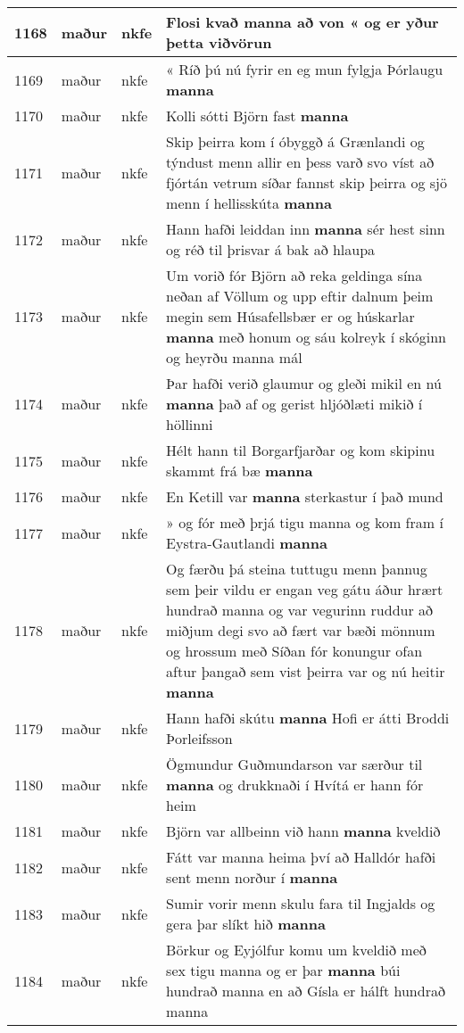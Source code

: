 \documentclass{article}
\begin{document}
\begin{longtable}{p{1cm}|p{1cm}|p{1cm}|p{13cm}}
\hline
1168&maður&nkfe&Flosi kvað \textbf{manna} að von « og er yður þetta viðvörun\\
\hline
1169&maður&nkfe&« Ríð þú nú fyrir en eg mun fylgja Þórlaugu \textbf{manna} \\
\hline
1170&maður&nkfe&Kolli sótti Björn fast \textbf{manna} \\
\hline
1171&maður&nkfe&Skip þeirra kom í óbyggð á Grænlandi og týndust menn allir en þess varð svo víst að fjórtán vetrum síðar fannst skip þeirra og sjö menn í hellisskúta \textbf{manna} \\
\hline
1172&maður&nkfe&Hann hafði leiddan inn \textbf{manna} sér hest sinn og réð til þrisvar á bak að hlaupa\\
\hline
1173&maður&nkfe&Um vorið fór Björn að reka geldinga sína neðan af Völlum og upp eftir dalnum þeim megin sem Húsafellsbær er og húskarlar \textbf{manna} með honum og sáu kolreyk í skóginn og heyrðu manna mál\\
\hline
1174&maður&nkfe&Þar hafði verið glaumur og gleði mikil en nú \textbf{manna} það af og gerist hljóðlæti mikið í höllinni\\
\hline
1175&maður&nkfe&Hélt hann til Borgarfjarðar og kom skipinu skammt frá bæ \textbf{manna} \\
\hline
1176&maður&nkfe&En Ketill var \textbf{manna} sterkastur í það mund\\
\hline
1177&maður&nkfe&» og fór með þrjá tigu manna og kom fram í Eystra-Gautlandi \textbf{manna} \\
\hline
1178&maður&nkfe&Og færðu þá steina tuttugu menn þannug sem þeir vildu er engan veg gátu áður hrært hundrað manna og var vegurinn ruddur að miðjum degi svo að fært var bæði mönnum og hrossum með Síðan fór konungur ofan aftur þangað sem vist þeirra var og nú heitir \textbf{manna} \\
\hline
1179&maður&nkfe&Hann hafði skútu \textbf{manna} Hofi er átti Broddi Þorleifsson\\
\hline
1180&maður&nkfe&Ögmundur Guðmundarson var særður til \textbf{manna} og drukknaði í Hvítá er hann fór heim\\
\hline
1181&maður&nkfe&Björn var allbeinn við hann \textbf{manna} kveldið\\
\hline
1182&maður&nkfe&Fátt var manna heima því að Halldór hafði sent menn norður í \textbf{manna} \\
\hline
1183&maður&nkfe&Sumir vorir menn skulu fara til Ingjalds og gera þar slíkt hið \textbf{manna} \\
\hline
1184&maður&nkfe&Börkur og Eyjólfur komu um kveldið með sex tigu manna og er þar \textbf{manna} búi hundrað manna en að Gísla er hálft hundrað manna\\

\end{longtable}
\end{document}
